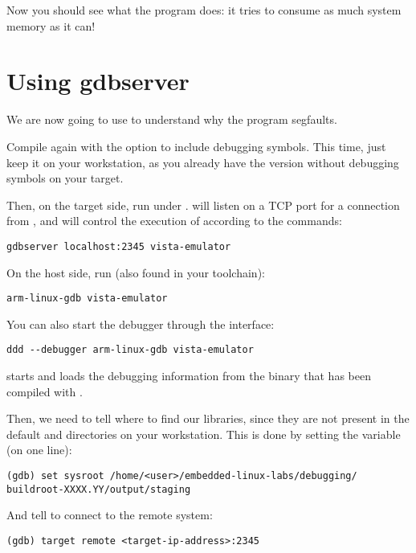 Now you should see what the program does: it tries to consume as much
system memory as it can!

\section{Using gdbserver}

We are now going to use  to understand why the program
segfaults.

Compile  again with the  option to
include debugging symbols. This time, just keep it on your workstation,
as you already have the version without debugging symbols on your target.

Then, on the target side, run  under
.  will listen on a TCP port for a
connection from , and will control the execution of
 according to the  commands:

\begin{verbatim}
gdbserver localhost:2345 vista-emulator
\end{verbatim}

On the host side, run  (also found in your toolchain):
\begin{verbatim}
arm-linux-gdb vista-emulator
\end{verbatim}

You can also start the debugger through the  interface:
\begin{verbatim}
ddd --debugger arm-linux-gdb vista-emulator
\end{verbatim}

 starts and loads the debugging information from the
 binary that has been compiled with .

Then, we need to tell where to find our libraries, since they are not
present in the default  and  directories on
your workstation. This is done by setting the  
variable (on one line):

\begin{verbatim}
(gdb) set sysroot /home/<user>/embedded-linux-labs/debugging/
buildroot-XXXX.YY/output/staging
\end{verbatim}

And tell  to connect to the remote system:
\begin{verbatim}
(gdb) target remote <target-ip-address>:2345
\end{verbatim}

